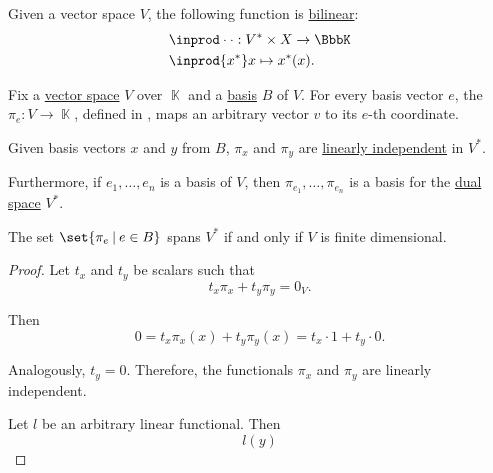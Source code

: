\begin{definition}\label{thm:natural_duality_pairing}
  Given a vector space \( V \), the following function is \hyperref[def:multilinear_function]{bilinear}:
  \begin{equation*}
    \begin{aligned}
      &\inprod \cdot \cdot: V^* \times X \to \BbbK \\
      &\inprod {x^*} x \mapsto x^*(x).
    \end{aligned}
  \end{equation*}
\end{definition}

\begin{proposition}\label{thm:algebraic_dual_basis}
  Fix a \hyperref[def:vector_space]{vector space} \( V \) over \( \BbbK \) and a \hyperref[def:hamel_basis]{basis} \( B \) of \( V \). For every basis vector \( e \), the  \( \pi_e: V \to \BbbK \), defined in , maps an arbitrary vector \( v \) to its \( e \)-th coordinate.

  \begin{thmenum}
     Given basis vectors \( x \) and \( y \) from \( B \), \( \pi_x \) and \( \pi_y \) are \hyperref[def:linear_dependence]{linearly independent} in \( V^* \).

     Furthermore, if \( e_1, \ldots, e_n \) is a basis of \( V \), then \( \pi_{e_1}, \ldots, \pi_{e_n} \) is a basis for the \hyperref[def:dual_vector_space]{dual space} \( V^* \).

     The set \( \set{ \pi_e \given e \in B } \) spans \( V^* \) if and only if \( V \) is finite dimensional.
  \end{thmenum}
\end{proposition}
\begin{proof}
   Let \( t_x \) and \( t_y \) be scalars such that
  \begin{equation*}
    t_x \pi_x + t_y \pi_y = 0_V.
  \end{equation*}

  Then
  \begin{equation*}
    0 = t_x \pi_x(x) + t_y \pi_y(x) = t_x \cdot 1 + t_y \cdot 0.
  \end{equation*}

  Analogously, \( t_y = 0 \). Therefore, the functionals \( \pi_x \) and \( \pi_y \) are linearly independent.

   Let \( l \) be an arbitrary linear functional. Then
  \begin{equation*}
    l(y)
  \end{equation*}

\end{proof}

